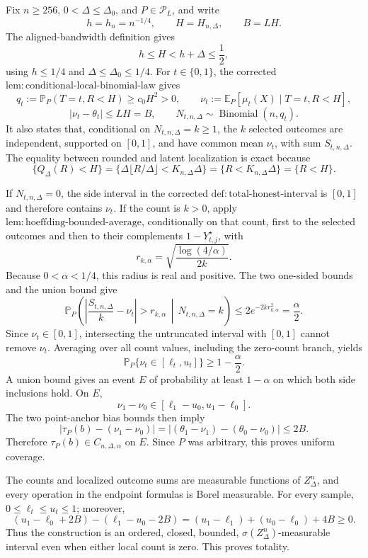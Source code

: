 Fix \(n\geq256\), \(0<\Delta\leq\Delta_0\), and \(P\in\mathcal P_L\), and write
\[
 h=h_n=n^{-1/4},\qquad H=H_{n,\Delta},\qquad B=LH.
\]
The aligned-bandwidth definition gives
\[
 h\leq H<h+\Delta\leq\frac12,
\]
using \(h\leq1/4\) and \(\Delta\leq\Delta_0\leq1/4\).  For \(t\in\{0,1\}\), the corrected \(\mathrm{lem:conditional\text{-}local\text{-}binomial\text{-}law}\) gives
\[
 q_t:=\mathbb P_P(T=t,R<H)\geq c_0H^2>0,
 \qquad
 \nu_t:=\mathbb E_P[\mu_t(X)\mid T=t,R<H],
\]
\[
 |\nu_t-\theta_t|\leq LH=B,
 \qquad
 N_{t,n,\Delta}\sim\operatorname{Binomial}(n,q_t).
\]
It also states that, conditional on \(N_{t,n,\Delta}=k\geq1\), the \(k\) selected outcomes are independent, supported on \([0,1]\), and have common mean \(\nu_t\), with sum \(S_{t,n,\Delta}\).  The equality between rounded and latent localization is exact because
\[
 \{Q_\Delta(R)<H\}
 =\{\Delta\lfloor R/\Delta\rfloor<K_{n,\Delta}\Delta\}
 =\{R<K_{n,\Delta}\Delta\}
 =\{R<H\}.
\]

If \(N_{t,n,\Delta}=0\), the side interval in the corrected \(\mathrm{def:total\text{-}honest\text{-}interval}\) is \([0,1]\) and therefore contains \(\nu_t\).  If the count is \(k>0\), apply \(\mathrm{lem:hoeffding\text{-}bounded\text{-}average}\), conditionally on that count, first to the selected outcomes and then to their complements \(1-Y_{t,j}^{\star}\), with
\[
 r_{k,\alpha}=\sqrt{\frac{\log(4/\alpha)}{2k}}.
\]
Because \(0<\alpha<1/4\), this radius is real and positive.  The two one-sided bounds and the union bound give
\[
 \mathbb P_P\!\left(\left|\frac{S_{t,n,\Delta}}k-\nu_t\right|>r_{k,\alpha}\,\middle|\,N_{t,n,\Delta}=k\right)
 \leq2e^{-2kr_{k,\alpha}^2}=\frac\alpha2.
\]
Since \(\nu_t\in[0,1]\), intersecting the untruncated interval with \([0,1]\) cannot remove \(\nu_t\).  Averaging over all count values, including the zero-count branch, yields
\[
 \mathbb P_P\{\nu_t\in[\ell_t,u_t]\}\geq1-\frac\alpha2.
\]
A union bound gives an event \(E\) of probability at least \(1-\alpha\) on which both side inclusions hold.  On \(E\),
\[
 \nu_1-\nu_0\in[\ell_1-u_0,u_1-\ell_0].
\]
The two point-anchor bias bounds then imply
\[
 |\tau_P(b)-(\nu_1-\nu_0)|
 =| (\theta_1-\nu_1)-(\theta_0-\nu_0)|
 \leq2B.
\]
Therefore \(\tau_P(b)\in C_{n,\Delta,\alpha}\) on \(E\).  Since \(P\) was arbitrary, this proves uniform coverage.

The counts and localized outcome sums are measurable functions of \(Z_\Delta^n\), and every operation in the endpoint formulas is Borel measurable.  For every sample, \(0\leq\ell_t\leq u_t\leq1\); moreover,
\[
 (u_1-\ell_0+2B)-(\ell_1-u_0-2B)
 =(u_1-\ell_1)+(u_0-\ell_0)+4B\geq0.
\]
Thus the construction is an ordered, closed, bounded, \(\sigma(Z_\Delta^n)\)-measurable interval even when either local count is zero.  This proves totality.

